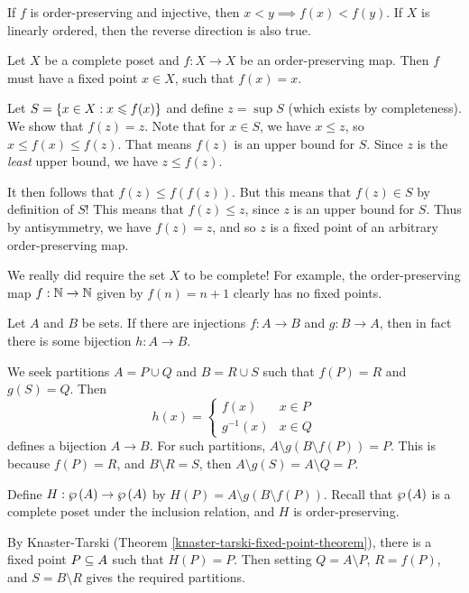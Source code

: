\documentclass{article}
\begin{document}
\begin{corollary}
	If $f$ is order-preserving and injective, then $x < y \implies f(x) < f(y)$. If $X$ is linearly ordered, then the reverse direction is also true.
\end{corollary}

\begin{theorem}
	\label{knaster-tarski-fixed-point-theorem}
    Let $X$ be a complete poset and $f : X \to X$ be an order-preserving map. Then $f$ must have a fixed point $x \in X$, such that $f(x) = x$.
\end{theorem}

\begin{prf}
    Let $S = \left\lbrace x \in X : x \leqslant f(x) \right\rbrace$ and define $z = \sup S$ (which exists by completeness). We show that $f(z) = z$. Note that for $x \in S$, we have $x \leq z$, so $x \leq f(x) \leq f(z)$. That means $f(z)$ is an upper bound for $S$. Since $z$ is the \textit{least} upper bound, we have $z \leq f(z)$.
    
    It then follows that $f(z) \leq f(f(z))$. But this means that $f(z) \in S$ by definition of $S$! This means that $f(z) \leq z$, since $z$ is an upper bound for $S$. Thus by antisymmetry, we have $f(z) = z$, and so $z$ is a fixed point of an arbitrary order-preserving map.
\end{prf}

\begin{note}
	We really did require the set $X$ to be complete! For example, the order-preserving map $f: \mathbb{N} \to \mathbb{N}$ given by $f(n) = n+1$ clearly has no fixed points.
\end{note}

\begin{theorem}
    Let $A$ and $B$ be sets. If there are injections $f: A \to B$ and $g: B \to A$, then in fact there is some bijection $h: A \to B$.
\end{theorem}

\begin{prf}
    We seek partitions $A = P \cup Q$ and $B = R \cup S$ such that $f(P) = R$ and $g(S) = Q$. Then
    \[
	h(x) = \begin{cases}
		f(x) & x \in P \\
		g^{-1}(x) & x \in Q
	\end{cases}
	\]
	defines a bijection $A \to B$. For such partitions, $A \setminus g(B \setminus f(P)) = P$. This is because $f(P) = R$, and $B \setminus R = S$, then $A \setminus g(S) = A \setminus Q = P$.
	
	Define $H : \wp\left(A\right) \to \wp\left(A\right)$ by $H(P) = A \setminus g(B \setminus f(P))$. Recall that $\wp\left(A\right)$ is a complete poset under the inclusion relation, and $H$ is order-preserving.
	
	By Knaster-Tarski (Theorem \ref{knaster-tarski-fixed-point-theorem}), there is a fixed point $P \subseteq A$ such that $H(P) = P$. Then setting $Q = A \setminus P$, $R = f(P)$, and $S = B \setminus R$ gives the required partitions.
\end{prf}
\end{document}
